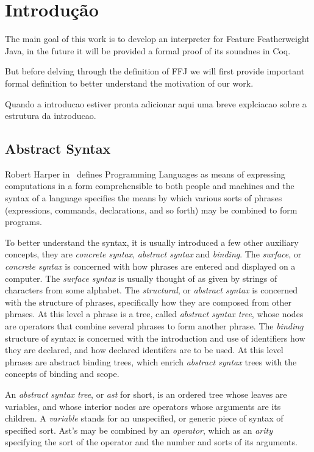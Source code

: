 \chapter{Introdução}
The main goal of this work is to develop an interpreter for Feature
Featherweight Java, in the future it will be provided a formal proof of its
soundnes in Coq.

But before delving through the definition of FFJ we will first provide
important formal definition to better understand the motivation of our work.

Quando a introducao estiver pronta adicionar aqui uma breve explciacao sobre a
estrutura da introducao.

\section{Abstract Syntax}
Robert Harper in~\cite{practicalFoundations} defines Programming Languages
as means of expressing computations in a form comprehensible to
both people and machines and the syntax of a language specifies the means
by which various sorts of phrases (expressions, commands, declarations, and
so forth) may be combined to form programs.

To better understand the syntax, it is usually introduced a few other auxiliary
concepts, they are \textit{concrete syntax}, \textit{abstract syntax} and
\textit{binding}.
The \textit{surface}, or \textit{concrete syntax} is concerned with how
phrases are entered and displayed on a computer. The \textit{surface
syntax} is usually thought of as given by strings of characters from some
alphabet. 
The \textit{structural}, or \textit{abstract syntax} is concerned
with the structure of phrases, specifically how they are composed from
other phrases. 
At this level a phrase is a tree, called \textit{abstract
syntax tree}, whose nodes are operators that combine several phrases to
form another phrase. The \textit{binding} structure of syntax is concerned
with the introduction and use of identifiers how they are declared, and how
declared identifers are to be used. At  this level phrases are abstract
binding trees, which enrich \textit{abstract syntax} trees with the
concepts of binding and scope.

An \textit{abstract syntax tree}, or \textit{ast} for short, is an
ordered tree whose leaves are variables, and whose interior nodes are
operators whose arguments are its children. A \textit{variable} stands
for an unspecified, or generic piece of syntax of specified sort. Ast's
may be combined by an \textit{operator}, which as an \textit{arity}
specifying the sort of the operator and the number and sorts of its
arguments. 

